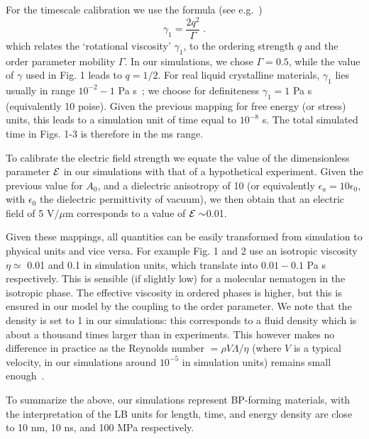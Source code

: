 \documentclass[12pt,twoside]{article}
\begin{document}
For the timescale calibration we use the formula (see e.g.~\cite{denniston})
\begin{equation}
\gamma_1=\frac{2q^2}{\Gamma}\;.
\end{equation}
 which relates the `rotational viscosity' $\gamma_1$, to the ordering strength $q$ and the order parameter mobility $\Gamma$.
In our simulations, we chose $\Gamma = 0.5$, while the value of $\gamma$ used in Fig. 1 leads to $q=1/2$.   
For real liquid crystalline materials, $\gamma_1$ lies usually in range $10^{-2}-1$ Pa s~\cite{deGennes}; we choose for definiteness $\gamma_1 = 1$ Pa s (equivalently 10 poise). Given the previous mapping for free energy (or stress) units, this leads to a simulation unit of time equal to $10^{-8}$ s. The total simulated time in Figs. 1-3 is therefore in the ms range. 

To calibrate the electric field strength 
we equate the value of the dimensionless parameter ${\cal E}$ in our 
simulations with that of a hypothetical experiment.
Given the previous value for $A_0$, and a dielectric anisotropy of 10
(or equivalently $\epsilon_a=10\epsilon_0$, with $\epsilon_0$ the
dielectric permittivity of vacuum), we then obtain that an electric field
of 5 V/$\mu$m corresponds to a value of ${\cal E}\sim$0.01. 

Given these mappings, all quantities can be easily transformed from
simulation to physical units and vice versa. For example Fig. 1 and 2
use an isotropic viscosity $\eta \simeq$ 0.01 and 0.1 in simulation units,
which translate into $0.01-0.1$ Pa s respectively. This is sensible (if 
slightly low) for a molecular nematogen in the isotropic phase. 
The effective viscosity in ordered phases is higher, but this is ensured
in our model by the coupling to the order parameter.
We note that the density is set to 1 in our simulations: this
corresponds to a fluid density which is about a thousand times larger
than in experiments. This however makes no difference in practice as
the Reynolds number $= \rho V\Lambda/\eta$ (where $V$ is a typical
velocity, in our simulations around $10^{-5}$ in simulation units) 
remains small enough~\cite{codef}. 

To summarize the above, our simulations represent BP-forming materials, with the interpretation of the LB units for length, time, and energy density are close to 10 nm, 10 ns, and 100 MPa respectively.


\end{document}
